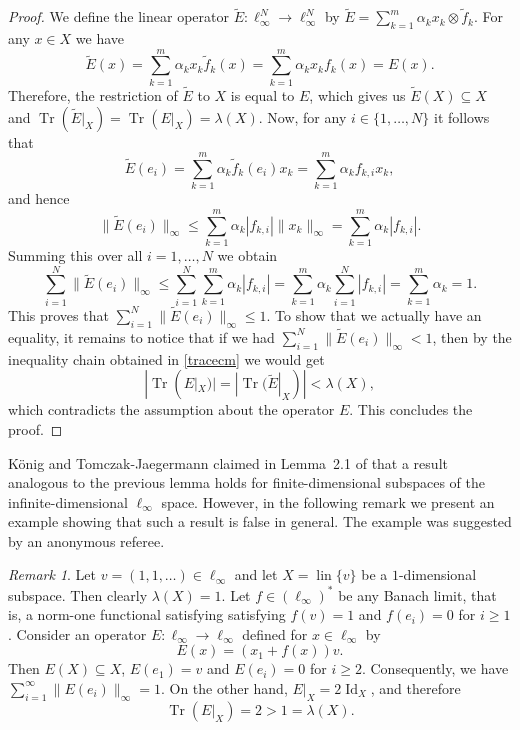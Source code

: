 \documentclass[12pt, reqno]{amsart}
\theoremstyle{definition}
\theoremstyle{remark}
\newtheorem{remark}[twr]{Remark}
\numberwithin{equation}{section}
\DeclareMathOperator{\lin}{lin}
\DeclareMathOperator{\tr}{Tr}
\DeclareMathOperator{\id}{Id}
\begin{document}
\begin{proof}
We define the linear operator $\widetilde{E}: \ell_{\infty}^N \to \ell_{\infty}^N$ by $\widetilde{E} = \sum_{k=1}^m \alpha_k x_k \otimes \tilde{f}_k$. For any $x \in X$ we have 
$$\widetilde{E}(x) = \sum_{k=1}^m \alpha_k x_k \tilde{f}_k(x) = \sum_{k=1}^m \alpha_k x_k f_k(x) = E(x).$$ 
Therefore, the restriction of $\widetilde{E}$ to $X$ is equal to $E$, which gives us $\widetilde{E}(X) \subseteq X$ and $\tr(\widetilde{E}|_X) = \tr(E|_X) = \lambda(X)$. Now, for any $i \in \{1, \ldots, N\}$ it follows that
$$\widetilde{E}(e_i) = \sum_{k=1}^m \alpha_k \tilde{f}_k(e_i) x_k = \sum_{k=1}^m \alpha_k f_{k,i} x_k,$$
and hence
$$\|\widetilde{E}(e_i)\|_{\infty} \leq \sum_{k=1}^{m} \alpha_k |f_{k, i}| \| x_k \|_{\infty} = \sum_{k=1}^{m} \alpha_k |f_{k, i}|.$$
Summing this over all $i = 1, \dots, N$ we obtain
$$\sum_{i=1}^N \|\widetilde{E}(e_i)\|_{\infty} \leq \sum_{i=1}^N \sum_{k=1}^m \alpha_k |f_{k,i}| = \sum_{k=1}^m \alpha_k \sum_{i=1}^N |f_{k,i}| = \sum_{k=1}^m \alpha_k = 1.$$
This proves that $\sum_{i=1}^N \|\widetilde{E}(e_i)\|_{\infty} \leq 1$. To show that we actually have an equality, it remains to notice that if we had $\sum_{i=1}^N \|\widetilde{E}(e_i)\|_{\infty} < 1$, then by the inequality chain obtained in \eqref{tracecm} we would get
$$|\tr(E|_X)|=|\tr(\widetilde{E}|_X)| < \lambda(X),$$
which contradicts the assumption about the operator $E$. This concludes the proof.

\end{proof}

K\"onig and Tomczak-Jaegermann claimed in Lemma~2.1 of \cite{konigtomczak} that a result analogous to the previous lemma holds for finite-dimensional subspaces of the infinite-dimensional $\ell_{\infty}$ space. However, in the following remark we present an example showing that such a result is false in general. The example was suggested by an anonymous referee.

\begin{remark}
\label{remarkcounterexample}
Let $v = (1, 1, \ldots) \in \ell_{\infty}$ and let $X = \lin \{v \}$ be a $1$-dimensional subspace. Then clearly $\lambda(X)=1$. Let $f \in (\ell_{\infty})^*$ be any Banach limit, that is, a norm-one functional satisfying satisfying $f(v)=1$ and $f(e_i)=0$ for $i \geq 1$. Consider an operator $E: \ell_{\infty} \to \ell_{\infty}$ defined for $x \in \ell_{\infty}$ by 
$$E(x) = (x_1+f(x))v.$$
Then $E(X) \subseteq X$, $E(e_1)=v$ and $E(e_i)=0$ for $i \geq 2$. Consequently, we have $\sum_{i=1}^{\infty} \|E(e_i)\|_{\infty}=1$. On the other hand, $E|_X=2 \id_X$, and therefore
$$\tr(E|_X)=2 > 1 = \lambda(X).$$
\end{remark}
\end{document}
